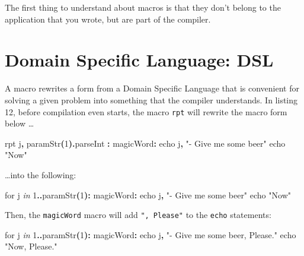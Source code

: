\documentclass[
  12pt,
]{book}
\newenvironment{Shaded}{}{}
\newcommand{\CommentTok}[1]{\textcolor[rgb]{0.38,0.63,0.69}{\textit{#1}}}
\newcommand{\DataTypeTok}[1]{\textcolor[rgb]{0.56,0.13,0.00}{#1}}
\newcommand{\DecValTok}[1]{\textcolor[rgb]{0.25,0.63,0.44}{#1}}
\newcommand{\KeywordTok}[1]{\textcolor[rgb]{0.00,0.44,0.13}{\textbf{#1}}}
\newcommand{\NormalTok}[1]{#1}
\newcommand{\StringTok}[1]{\textcolor[rgb]{0.25,0.44,0.63}{#1}}
\begin{document}
The first thing to understand about macros is that they don't belong to
the application that you wrote, but are part of the compiler.

\section{Domain Specific Language:
DSL}\label{domain-specific-language-dsl}

A macro rewrites a form from a Domain Specific Language that is
convenient for solving a given problem into something that the compiler
understands. In listing 12, before compilation even starts, the macro
\texttt{rpt} will rewrite the macro form below \ldots

\begin{Shaded}
\begin{Highlighting}[]
\DataTypeTok{rpt}\NormalTok{ j}\KeywordTok{,} \DataTypeTok{paramStr}\KeywordTok{(}\DecValTok{1}\KeywordTok{).}\DataTypeTok{parseInt} \KeywordTok{:}
\NormalTok{  magicWord}\KeywordTok{:}
     \DataTypeTok{echo}\NormalTok{ j}\KeywordTok{,} \StringTok{"{-} Give me some beer"}
     \DataTypeTok{echo} \StringTok{"Now"}
\end{Highlighting}
\end{Shaded}

\ldots into the following:

\begin{Shaded}
\begin{Highlighting}[]
\DataTypeTok{for}\NormalTok{ j }\CommentTok{in} \DecValTok{1}\KeywordTok{..}\DataTypeTok{paramStr}\KeywordTok{(}\DecValTok{1}\KeywordTok{):}
\NormalTok{  magicWord}\KeywordTok{:}
    \DataTypeTok{echo}\NormalTok{ j}\KeywordTok{,} \StringTok{"{-} Give me some beer"}
    \DataTypeTok{echo} \StringTok{"Now"}
\end{Highlighting}
\end{Shaded}

Then, the \texttt{magicWord} macro will add \texttt{",\ Please"} to the
\texttt{echo} statements:

\begin{Shaded}
\begin{Highlighting}[]
\DataTypeTok{for}\NormalTok{ j }\CommentTok{in} \DecValTok{1}\KeywordTok{..}\DataTypeTok{paramStr}\KeywordTok{(}\DecValTok{1}\KeywordTok{):}
\NormalTok{  magicWord}\KeywordTok{:}
    \DataTypeTok{echo}\NormalTok{ j}\KeywordTok{,} \StringTok{"{-} Give me some beer, Please."}
    \DataTypeTok{echo} \StringTok{"Now, Please."}
\end{Highlighting}
\end{Shaded}
\end{document}
